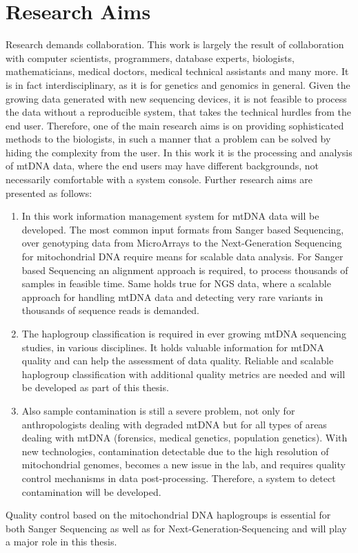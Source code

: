 \section{Research Aims}
\label{researchaims}
Research demands collaboration. This work is largely the result of collaboration with computer scientists, programmers, database experts, biologists, mathematicians, medical doctors, medical technical assistants and many more. It is in fact interdisciplinary, as it is for genetics and genomics in general. Given the growing data generated with new sequencing devices, it is not feasible to process the data without a reproducible system, that takes the technical hurdles from the end user. Therefore, one of the main research aims is on providing sophisticated methods to the biologists, in such a manner that a problem can be solved by hiding the complexity from the user. In this work it is the processing and analysis of mtDNA data, where the end users may have different backgrounds, not necessarily comfortable with a system console. Further research aims are presented as follows:
\begin{enumerate}
\item
In this work information management system for mtDNA data will be developed. 
The most common input formats from Sanger based Sequencing, over genotyping data from MicroArrays to the Next-Generation Sequencing for mitochondrial DNA require means for scalable data analysis. 
For Sanger based Sequencing an alignment approach is required, to process thousands of samples in feasible time. Same holds true for NGS data, where a scalable approach for handling mtDNA data and detecting very rare variants in thousands of sequence reads is demanded.
\item The haplogroup classification is required in ever growing mtDNA sequencing studies, in various disciplines. It holds valuable information for mtDNA quality and can help the assessment of data quality. Reliable and scalable haplogroup classification with additional quality metrics are needed and will be developed as part of this thesis.
\item Also sample contamination is still a severe problem, not only for anthropologists dealing with degraded mtDNA but for all types of areas dealing with mtDNA (forensics, medical genetics, population genetics). With new technologies, contamination detectable due to the high resolution of mitochondrial genomes, becomes a new issue in the lab, and requires quality control mechanisms in data post-processing. Therefore, a system to detect contamination will be developed. 
\end{enumerate}
Quality control based on the mitochondrial DNA haplogroups is essential for both Sanger Sequencing as well as for Next-Generation-Sequencing and will play a major role in this thesis.

